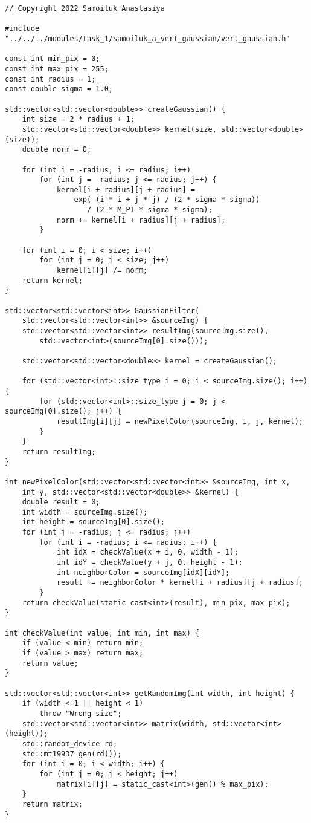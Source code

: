 \documentclass{report}
\begin{document}
\begin{lstlisting}
// Copyright 2022 Samoiluk Anastasiya

#include "../../../modules/task_1/samoiluk_a_vert_gaussian/vert_gaussian.h"

const int min_pix = 0;
const int max_pix = 255;
const int radius = 1;
const double sigma = 1.0;

std::vector<std::vector<double>> createGaussian() {
    int size = 2 * radius + 1;
    std::vector<std::vector<double>> kernel(size, std::vector<double>(size));
    double norm = 0;

    for (int i = -radius; i <= radius; i++)
        for (int j = -radius; j <= radius; j++) {
            kernel[i + radius][j + radius] =
                exp(-(i * i + j * j) / (2 * sigma * sigma))
                   / (2 * M_PI * sigma * sigma);
            norm += kernel[i + radius][j + radius];
        }

    for (int i = 0; i < size; i++)
        for (int j = 0; j < size; j++)
            kernel[i][j] /= norm;
    return kernel;
}

std::vector<std::vector<int>> GaussianFilter(
    std::vector<std::vector<int>> &sourceImg) {
    std::vector<std::vector<int>> resultImg(sourceImg.size(),
        std::vector<int>(sourceImg[0].size()));

    std::vector<std::vector<double>> kernel = createGaussian();

    for (std::vector<int>::size_type i = 0; i < sourceImg.size(); i++) {
        for (std::vector<int>::size_type j = 0; j < sourceImg[0].size(); j++) {
            resultImg[i][j] = newPixelColor(sourceImg, i, j, kernel);
        }
    }
    return resultImg;
}

int newPixelColor(std::vector<std::vector<int>> &sourceImg, int x,
    int y, std::vector<std::vector<double>> &kernel) {
    double result = 0;
    int width = sourceImg.size();
    int height = sourceImg[0].size();
    for (int j = -radius; j <= radius; j++)
        for (int i = -radius; i <= radius; i++) {
            int idX = checkValue(x + i, 0, width - 1);
            int idY = checkValue(y + j, 0, height - 1);
            int neighborColor = sourceImg[idX][idY];
            result += neighborColor * kernel[i + radius][j + radius];
        }
    return checkValue(static_cast<int>(result), min_pix, max_pix);
}

int checkValue(int value, int min, int max) {
    if (value < min) return min;
    if (value > max) return max;
    return value;
}

std::vector<std::vector<int>> getRandomImg(int width, int height) {
    if (width < 1 || height < 1)
        throw "Wrong size";
    std::vector<std::vector<int>> matrix(width, std::vector<int>(height));
    std::random_device rd;
    std::mt19937 gen(rd());
    for (int i = 0; i < width; i++) {
        for (int j = 0; j < height; j++)
            matrix[i][j] = static_cast<int>(gen() % max_pix);
    }
    return matrix;
}
\end{lstlisting}
\end{document}

